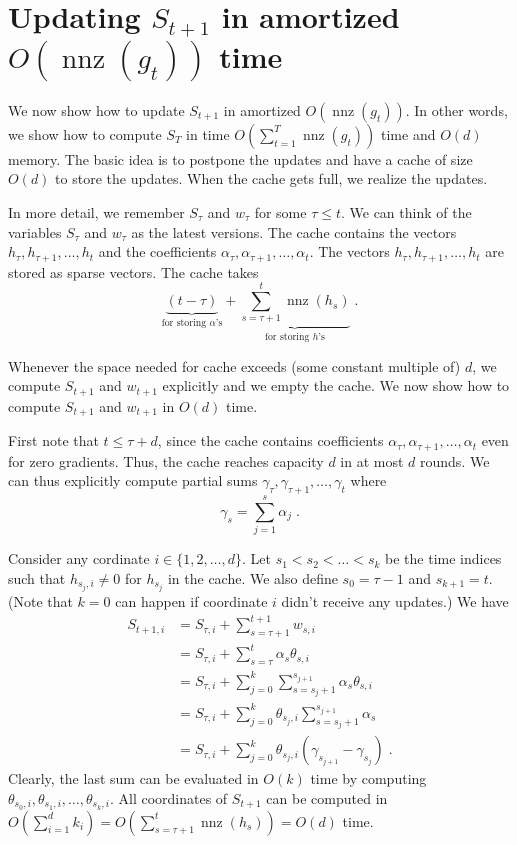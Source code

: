\documentclass{article}
\DeclareMathOperator*{\nnz}{nnz}
\begin{document}
\section{Updating $S_{t+1}$ in amortized $O(\nnz(g_t))$ time}

We now show how to update $S_{t+1}$ in amortized $O(\nnz(g_t))$. In other
words, we show how to compute $S_T$ in time $O(\sum_{t=1}^T \nnz(g_t))$ time
and $O(d)$ memory. The basic idea is to postpone the updates and have a cache of
size $O(d)$ to store the updates. When the cache gets full, we realize the
updates.

In more detail, we remember $S_\tau$ and $w_\tau$ for some $\tau \le t$.
We can think of the variables $S_\tau$ and $w_\tau$ as the
latest versions. The cache contains the vectors $h_\tau, h_{\tau + 1},
\dots, h_t$ and the coefficients $\alpha_\tau, \alpha_{\tau + 1}, \dots,
\alpha_t$. The vectors $h_\tau, h_{\tau + 1}, \dots, h_t$ are stored as
sparse vectors. The cache takes
$$
\underbrace{(t - \tau)}_{\text{for storing $\alpha$'s}} + \underbrace{\sum_{s=\tau + 1}^t \nnz(h_s)}_{\text{for storing $h$'s}} \; .
$$

Whenever the space needed for cache exceeds  (some constant multiple of) $d$,
we compute $S_{t+1}$ and $w_{t+1}$ explicitly and we empty the cache. We now
show how to compute $S_{t+1}$ and $w_{t+1}$ in $O(d)$ time.

First note that $t \le \tau + d$, since the cache contains coefficients
$\alpha_\tau, \alpha_{\tau + 1}, \dots, \alpha_t$ even for zero gradients. Thus, the cache
reaches capacity $d$ in at most $d$ rounds. We can thus
explicitly compute partial sums $\gamma_{\tau}, \gamma_{\tau + 1}, \dots, \gamma_t$
where
$$
\gamma_s = \sum_{j=1}^s \alpha_j \; .
$$

Consider any cordinate $i \in \{1,2,\dots,d\}$. Let $s_1 < s_2 < \dots < s_k$
be the time indices such that $h_{s_j,i} \neq 0$ for $h_{s_j}$ in the cache.
We also define $s_0 = \tau - 1$ and $s_{k+1} = t$. (Note that $k=0$ can happen if
coordinate $i$ didn't receive any updates.) We have
\begin{align*}
S_{t+1,i}
& = S_{\tau,i} + \sum_{s=\tau + 1}^{t+1} w_{s,i} \\
& = S_{\tau,i} + \sum_{s=\tau}^t \alpha_s \theta_{s,i} \\
& = S_{\tau,i} + \sum_{j=0}^k \sum_{s=s_j + 1}^{s_{j+1}} \alpha_s \theta_{s,i} \\
& = S_{\tau,i} + \sum_{j=0}^k \theta_{s_j,i} \sum_{s=s_j + 1}^{s_{j+1}} \alpha_s \\
& = S_{\tau,i} + \sum_{j=0}^k \theta_{s_j,i} (\gamma_{s_{j+1}} - \gamma_{s_j}) \; .
\end{align*}
Clearly, the last sum can be evaluated in $O(k)$ time by computing $\theta_{s_0,i}, \theta_{s_1,i}, \dots, \theta_{s_k,i}$.
All coordinates of $S_{t+1}$ can be computed in $O(\sum_{i=1}^d k_i) =
O(\sum_{s=\tau + 1}^t \nnz(h_s)) = O(d)$ time.
\end{document}
